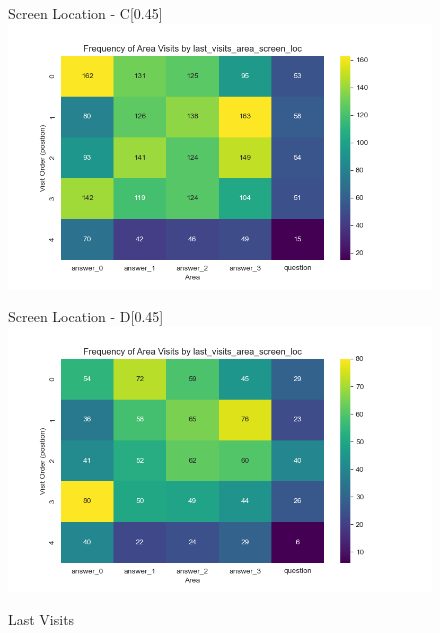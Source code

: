 \documentclass{article}
\begin{document}
\begin{figure}[H]
  \begin{subcaptionbox}{Screen Location - C\label{fig:sl_c}}[0.45\textwidth]
    {\centering\includegraphics[width=\linewidth]{plots/visits/matrix__last_visits_area_screen_loc_gatherers_C.png}}
  \end{subcaptionbox}
  \hfill
  \begin{subcaptionbox}{Screen Location - D\label{fig:sl_d}}[0.45\textwidth]
    {\centering\includegraphics[width=\linewidth]{plots/visits/matrix__last_visits_area_screen_loc_gatherers_D.png}}
  \end{subcaptionbox}
  
  \caption{Last Visits}
  \label{fig:fourimages4}
\end{figure}
\end{document}

